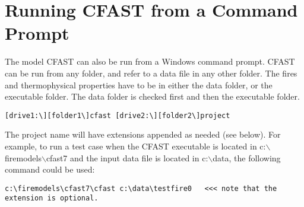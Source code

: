 




\chapter{Running CFAST from a Command Prompt}

The model CFAST can also be run from a Windows command prompt.  CFAST can be run from any folder, and refer to a data file in any other folder. The fires and thermophysical properties have to be in either the data folder, or the executable folder. The data folder is checked first and then the executable folder.

\begin{lstlisting}
[drive1:\][folder1\]cfast [drive2:\][folder2\]project
\end{lstlisting}

The project name will have extensions appended as needed (see below). For example, to run a test case when the CFAST executable is located in c:$\backslash$firemodels$\backslash$cfast7 and the input data file is located in c:$\backslash$data, the following command could be used:

\begin{lstlisting}
c:\firemodels\cfast7\cfast c:\data\testfire0   <<< note that the extension is optional.
\end{lstlisting}

